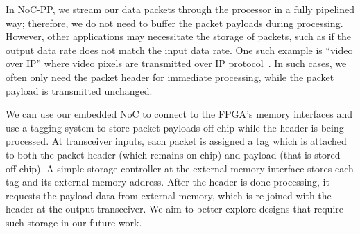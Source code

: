 

In NoC-PP, we stream our data packets through the processor in a fully pipelined way; therefore, we do not need to buffer the packet payloads during processing.
However, other applications may necessitate the storage of packets, such as if the output data rate does not match the input data rate.
One such example is ``video over IP'' where video pixels are transmitted over IP protocol~\cite{altera_voip}.
In such cases, we often only need the packet header for immediate processing, while the packet payload is transmitted unchanged.

We can use our embedded NoC to connect to the FPGA's memory interfaces and use a tagging system to store packet payloads off-chip while the header is being processed.
At transceiver inputs, each packet is assigned a tag which is attached to both the packet header (which remains on-chip) and payload (that is stored off-chip).
A simple storage controller at the external memory interface stores each tag and its external memory address.
After the header is done processing, it requests the payload data from external memory, which is re-joined with the header at the output transceiver.
We aim to better explore designs that require such storage in our future work.
